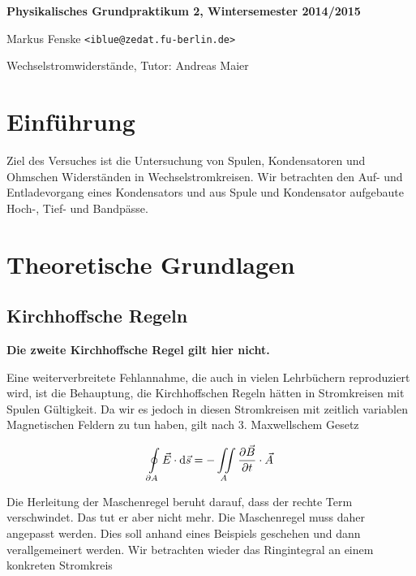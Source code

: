 \documentclass[a4paper,german,12pt,smallheadings]{scrartcl}
\begin{document}
\allowdisplaybreaks %
\begin{center}
\bfseries %
\sffamily %
\vspace{-40pt}
Physikalisches Grundpraktikum 2, Wintersemester 2014/2015

Markus Fenske \texttt{<iblue@zedat.fu-berlin.de>}

Wechselstromwiderstände, Tutor: Andreas Maier
\vspace{-10pt}
\end{center}
\section{Einführung}
Ziel des Versuches ist die Untersuchung von Spulen, Kondensatoren und Ohmschen
Widerständen in Wechselstromkreisen. Wir betrachten den Auf- und Entladevorgang
eines Kondensators und aus Spule und Kondensator aufgebaute Hoch-, Tief- und
Bandpässe.

\section{Theoretische Grundlagen}

\subsection{Kirchhoffsche Regeln}

\textbf{Die zweite Kirchhoffsche Regel gilt hier nicht.}

Eine weiterverbreitete Fehlannahme, die auch in vielen Lehrbüchern reproduziert
wird, ist die Behauptung, die Kirchhoffschen Regeln hätten in Stromkreisen mit
Spulen Gültigkeit. Da wir es jedoch in diesen Stromkreisen mit zeitlich
variablen Magnetischen Feldern zu tun haben, gilt nach 3. Maxwellschem Gesetz

\begin{equation}
  \oint\limits_{\partial A} \vec{E} \cdot \dif \vec{s} = - \iint\limits_{A} \frac{\partial \vec{B}}{\partial t} \cdot \vec{A}
\end{equation}

Die Herleitung der Maschenregel beruht darauf, dass der rechte Term
verschwindet. Das tut er aber nicht mehr. Die Maschenregel muss daher angepasst
werden. Dies soll anhand eines Beispiels geschehen und dann verallgemeinert
werden. Wir betrachten wieder das Ringintegral an einem konkreten Stromkreis
\end{document}
